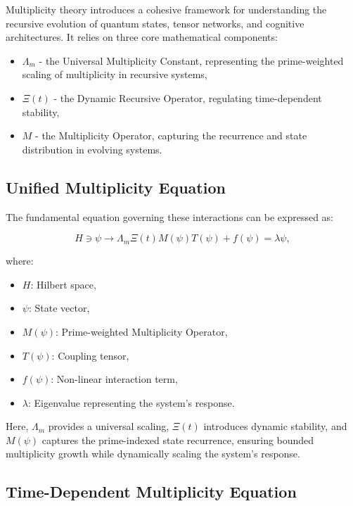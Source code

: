 \documentclass{article}
\theoremstyle{plain}
\begin{document}
Multiplicity theory introduces a cohesive framework for understanding the recursive evolution of quantum states, tensor networks, and cognitive architectures. It relies on three core mathematical components:

\begin{itemize}
    \item \(\Lambda_m\) - the Universal Multiplicity Constant, representing the prime-weighted scaling of multiplicity in recursive systems,
    \item \(\Xi(t)\) - the Dynamic Recursive Operator, regulating time-dependent stability,
    \item \(M\) - the Multiplicity Operator, capturing the recurrence and state distribution in evolving systems.
\end{itemize}

\subsection{Unified Multiplicity Equation}

The fundamental equation governing these interactions can be expressed as:

\begin{equation}
H \ni \psi \rightarrow \Lambda_m \Xi(t) M(\psi) T(\psi) + f(\psi) = \lambda \psi,
\end{equation}

where:
\begin{itemize}
    \item \( H \): Hilbert space,
    \item \( \psi \): State vector,
    \item \( M(\psi) \): Prime-weighted Multiplicity Operator,
    \item \( T(\psi) \): Coupling tensor,
    \item \( f(\psi) \): Non-linear interaction term,
    \item \( \lambda \): Eigenvalue representing the system's response.
\end{itemize}

Here, \(\Lambda_m\) provides a universal scaling, \(\Xi(t)\) introduces dynamic stability, and \(M(\psi)\) captures the prime-indexed state recurrence, ensuring bounded multiplicity growth while dynamically scaling the system’s response.

\subsection{Time-Dependent Multiplicity Equation}
\end{document}
